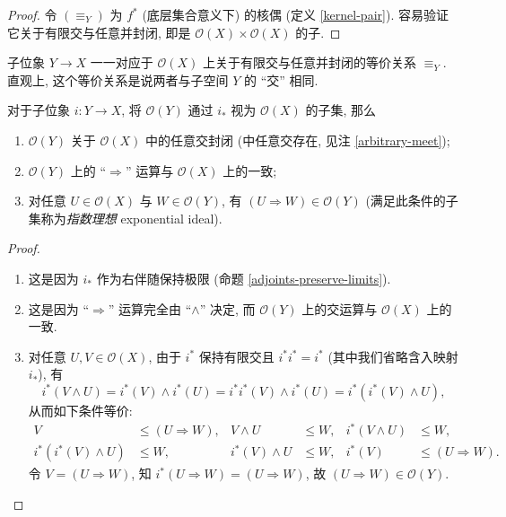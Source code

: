 \begin{proof}
	令 $(\equiv_Y)$ 为 $f^*$ (底层集合意义下) 的核偶 (定义 \ref{kernel-pair}). 容易验证它关于有限交与任意并封闭, 即是 $\mathcal O(X)\times\mathcal O(X)$ 的子\fm{}.
\end{proof}

子位象 $Y\to X$ 一一对应于 $\mathcal O(X)$ 上关于有限交与任意并封闭的等价关系 $\equiv_Y$. 直观上, 这个等价关系是说两者与子空间 $Y$ 的 ``交'' 相同.


\begin{prop}
	[label={sublocale-exponential-ideal}]
	{}
	对于子位象 $i\colon Y\to X$, 将 $\mathcal O(Y)$ 通过 $i_*$ 视为 $\mathcal O(X)$ 的子集,
	那么
	\begin{enumerate}[(1)]
		\item $\mathcal O(Y)$ 关于 $\mathcal O(X)$ 中的任意交封闭 (\fm{}中任意交存在, 见注 \ref{arbitrary-meet});
		\item $\mathcal O(Y)$ 上的 ``$\Rightarrow$'' 运算与 $\mathcal O(X)$ 上的一致;
		\item 对任意 $U\in\mathcal O(X)$ 与 $W\in\mathcal O(Y)$, 有 $(U\Rightarrow W)\in \mathcal O(Y)$ (满足此条件的子集称为\emph{指数理想} exponential ideal).
	\end{enumerate}
\end{prop}
\begin{proof}~
	\begin{enumerate}
		[(1)]
		\item 这是因为 $i_*$ 作为右伴随保持极限 (命题 \ref{adjoints-preserve-limits}).
		\item 这是因为 ``$\Rightarrow$'' 运算完全由 ``$\land$'' 决定, 而 $\mathcal O(Y)$ 上的交运算与 $\mathcal O(X)$ 上的一致.
		\item 对任意 $U,V\in\mathcal O(X)$, 由于 $i^*$ 保持有限交且 $i^*i^*=i^*$ (其中我们省略含入映射 $i_*$), 有
		\[
		i^*(V\land U) = i^*(V)\land i^*(U) = i^*i^*(V)\land i^*(U) = i^*(i^*(V)\land U),
		\]
		从而如下条件等价:
		\begin{align*}
			V&\leq (U\Rightarrow W) , &
			V\land U&\leq W, &
			i^*(V\land U)&\leq W,\\
			i^*(i^*(V)\land U)&\leq W,&
			i^*(V)\land U&\leq W,&
			i^*(V)&\leq (U\Rightarrow W).
		\end{align*}
		令 $V=(U\Rightarrow W)$, 知 $i^*(U\Rightarrow W) = (U\Rightarrow W)$, 故 $(U\Rightarrow W)\in \mathcal O(Y)$.
	\end{enumerate}
\end{proof}

